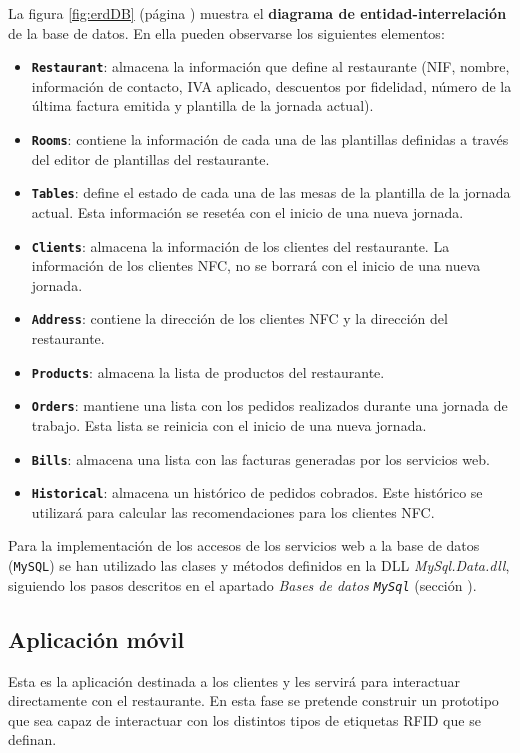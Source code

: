 La figura \ref{fig:erdDB} (página \pageref{fig:erdDB}) muestra el
\textbf{diagrama de entidad-interrelación} de la base de datos. En ella pueden 
observarse los siguientes elementos:
\begin{itemize}
\item \textbf{\texttt{Restaurant}}: almacena la información que define al 
restaurante (NIF, nombre, información de contacto, IVA aplicado, descuentos por 
fidelidad, número de la última factura emitida y plantilla de la jornada 
actual).
\item \textbf{\texttt{Rooms}}: contiene la información de cada una de las 
plantillas definidas a través del editor de plantillas del restaurante.
\item \textbf{\texttt{Tables}}: define el estado de cada una de las mesas de la
plantilla de la jornada actual. Esta información se resetéa con el inicio
de una nueva jornada.
\item \textbf{\texttt{Clients}}: almacena la información de los clientes del
restaurante. La información de los clientes \acs{NFC}, no se borrará con el
inicio de una nueva jornada.
\item \textbf{\texttt{Address}}: contiene la dirección de los clientes
\acs{NFC} y la dirección del restaurante.
\item \textbf{\texttt{Products}}: almacena la lista de productos del 
restaurante.
\item \textbf{\texttt{Orders}}: mantiene una lista con los pedidos realizados 
durante una jornada de trabajo. Esta lista se reinicia con el inicio de una 
nueva jornada.
\item \textbf{\texttt{Bills}}: almacena una lista con las facturas generadas 
por los servicios web.
\item \textbf{\texttt{Historical}}: almacena un histórico de pedidos cobrados. 
Este histórico se utilizará para calcular las recomendaciones para los clientes
\acs{NFC}.
\end{itemize}

Para la implementación de los accesos de los servicios web a la base de datos 
(\texttt{MySQL}) se han utilizado las clases y métodos definidos en la \acs{DLL}
\emph{MySql.Data.dll}, siguiendo los pasos descritos en el apartado
\emph{Bases de datos \texttt{MySql}} (sección \label{subsec:webServicesApp}).

\subsection{Aplicación móvil}
Esta es la aplicación destinada a los clientes y les servirá para interactuar
directamente con el restaurante. En esta fase se pretende construir un
prototipo que sea capaz de interactuar con los distintos
tipos de etiquetas \acs{RFID} que se definan.

